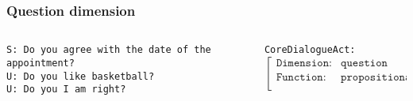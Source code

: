 \documentclass[11pt]{beamer}
\begin{document}
\begin{frame}[fragile]
\frametitle{Question dimension}
	\begin{center}
	\end{center}
	\vspace{15pt}
	\begin{columns}
		\begin{column}{0.58\textwidth}
		{\color{red} 
			\texttt{S: Do you agree with the date of the appointment?}\\}
			\vspace{10pt}
		{\color{teal} 
			\texttt{U: Do you like basketball?}\\
			\vspace{10pt}
			\texttt{U: Do you I am right?}\\
		}
		\end{column}
		\begin{column}{0.42\textwidth}
			\footnotesize
			\texttt{CoreDialogueAct:} \\
				\vspace{10pt}
				$\begin{bmatrix}
						\texttt{Dimension:}    & \texttt{question}\\ 
						\texttt{Function:}     & \texttt{propositional}\\ 
				\end{bmatrix}$
		\end{column}
	\end{columns}
\end{frame}
\end{document}
